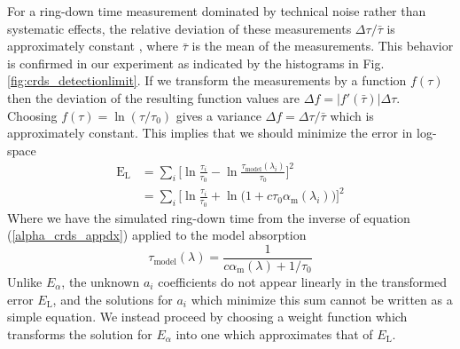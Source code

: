 For a ring-down time measurement dominated by technical noise rather than systematic effects, the relative deviation of these measurements $\Delta\tau/\bar{\tau}$ is approximately constant \cite{vanZee_1999}, where $\bar\tau$ is the mean of the measurements. This behavior is confirmed in our experiment as indicated by the histograms in Fig. \ref{fig:crds_detectionlimit}. If we transform the measurements by a function $f(\tau)$ then the deviation of the resulting function values are $\Delta f = \left|f'(\bar\tau)\right| \Delta \tau$. Choosing $f(\tau) = \ln(\tau/\tau_0)$ gives a variance $\Delta f = \Delta \tau/\bar{\tau}$ which is approximately constant. This implies that we should minimize the error in log-space
\begin{align} \label{error_log}
	\mathrm{E}_\mathrm{L} &= \sum_i \Big[\ln \frac{\tau_i}{\tau_0} - \ln\frac{\tau_\mathrm{model}(\lambda_i)}{\tau_0}\Big]^2 \nonumber \\
	&= \sum_i \Big[\ln \frac{\tau_i}{\tau_0} + \ln\big(1+c\tau_0\alpha_\mathrm{m}(\lambda_i)\big)\Big]^2
\end{align}
Where we have the simulated ring-down time from the inverse of equation (\ref{alpha_crds_appdx}) applied to the model absorption
\begin{equation}
	\tau_\mathrm{model}(\lambda) = \frac{1}{c\alpha_\mathrm{m}(\lambda) + 1/\tau_0}
\end{equation}
Unlike $E_\alpha$, the unknown $a_i$ coefficients do not appear linearly in the transformed error $E_\mathrm{L}$, and the solutions for $a_i$ which minimize this sum cannot be written as a simple equation. We instead proceed by choosing a weight function which transforms the solution for $E_\alpha$ into one which approximates that of $E_\mathrm{L}$.

